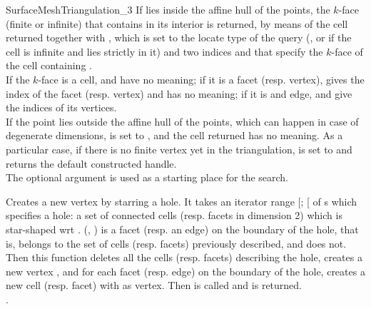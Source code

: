 \begin{ccRefConcept}{SurfaceMeshTriangulation_3}
{If  lies inside the affine hull of the points, the $k$-face
(finite or infinite) that contains  in its interior is
returned, by means of the cell returned together with , which
is set to the locate type of the query (, or  if the cell is infinite and 
lies strictly in it) and two indices  and  that
specify the $k$-face of the cell containing .\\ 
If the $k$-face is a cell,  and  have no
meaning; if it is a facet (resp. vertex),  gives the index of
the facet (resp. vertex) and  has no meaning; if it is and
edge,  and  give the indices of its vertices.\\ 
If the point  lies outside the affine hull of the points,
which can happen in case of degenerate dimensions,  is set to
, and the cell returned has no meaning.
As a particular case, if there is no finite vertex yet in the
triangulation,  is set to  and
 returns the default constructed handle. \\
The optional argument  is used as a starting place for the search.
}

{Creates a new vertex by starring a hole.  It takes an iterator range
[; [ of s which specifies
a hole: a set of connected cells (resp. facets in dimension 2) which is
star-shaped wrt .
(, ) is a facet (resp. an edge) on the boundary of the hole,
that is,  belongs to the set of cells (resp.  facets) previously
described, and  does not.  Then this function deletes
all the cells (resp. facets) describing the hole, creates a new vertex
, and for each facet (resp. edge) on the boundary of the hole, creates
a new cell (resp. facet) with  as vertex.  Then 
is called and  is returned.\\
.}


\end{ccRefConcept}
